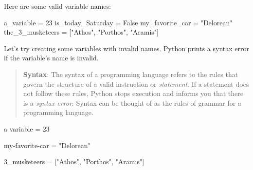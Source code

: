 \documentclass[
  letterpaper,
  DIV=11,
  numbers=noendperiod]{scrreprt}
\newenvironment{Shaded}{\begin{snugshade}}{\end{snugshade}}
\newcommand{\DecValTok}[1]{\textcolor[rgb]{0.68,0.00,0.00}{#1}}
\newcommand{\ErrorTok}[1]{\textcolor[rgb]{0.68,0.00,0.00}{#1}}
\newcommand{\NormalTok}[1]{\textcolor[rgb]{0.00,0.23,0.31}{#1}}
\newcommand{\OperatorTok}[1]{\textcolor[rgb]{0.37,0.37,0.37}{#1}}
\newcommand{\StringTok}[1]{\textcolor[rgb]{0.13,0.47,0.30}{#1}}
\newcommand{\VariableTok}[1]{\textcolor[rgb]{0.07,0.07,0.07}{#1}}
\begin{document}
Here are some valid variable names:

\begin{Shaded}
\begin{Highlighting}[]
\NormalTok{a\_variable }\OperatorTok{=} \DecValTok{23}
\NormalTok{is\_today\_Saturday }\OperatorTok{=} \VariableTok{False}
\NormalTok{my\_favorite\_car }\OperatorTok{=} \StringTok{"Delorean"}
\NormalTok{the\_3\_musketeers }\OperatorTok{=}\NormalTok{ [}\StringTok{"Athos"}\NormalTok{, }\StringTok{"Porthos"}\NormalTok{, }\StringTok{"Aramis"}\NormalTok{] }
\end{Highlighting}
\end{Shaded}

Let's try creating some variables with invalid names. Python prints a
syntax error if the variable's name is invalid.

\begin{quote}
\textbf{Syntax}: The syntax of a programming language refers to the
rules that govern the structure of a valid instruction or
\emph{statement}. If a statement does not follow these rules, Python
stops execution and informs you that there is a \emph{syntax error}.
Syntax can be thought of as the rules of grammar for a programming
language.
\end{quote}

\begin{Shaded}
\begin{Highlighting}[]
\NormalTok{a variable }\OperatorTok{=} \DecValTok{23}
\end{Highlighting}
\end{Shaded}

\begin{Shaded}
\end{Shaded}

\begin{Shaded}
\begin{Highlighting}[]
\NormalTok{my}\OperatorTok{{-}}\NormalTok{favorite}\OperatorTok{{-}}\NormalTok{car }\OperatorTok{=} \StringTok{"Delorean"}
\end{Highlighting}
\end{Shaded}

\begin{Shaded}
\begin{Highlighting}[]
\DecValTok{3}\ErrorTok{\_musketeers} \OperatorTok{=}\NormalTok{ [}\StringTok{"Athos"}\NormalTok{, }\StringTok{"Porthos"}\NormalTok{, }\StringTok{"Aramis"}\NormalTok{]}
\end{Highlighting}
\end{Shaded}
\end{document}
